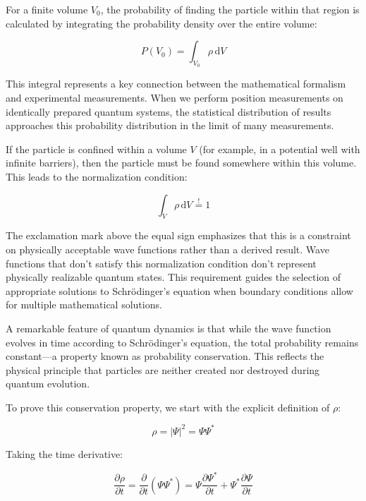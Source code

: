 \documentclass[italian]{HKNdocument}
\begin{document}
For a finite volume $V_{0}$, the probability of finding the particle within that region is calculated by integrating the probability density over the entire volume:

\begin{equation}
P\left(V_{0}\right)=\int_{V_{0}} \rho \, \mathrm{d} V \label{eq:1.25}
\end{equation}

This integral represents a key connection between the mathematical formalism and experimental measurements. When we perform position measurements on identically prepared quantum systems, the statistical distribution of results approaches this probability distribution in the limit of many measurements.

If the particle is confined within a volume $V$ (for example, in a potential well with infinite barriers), then the particle must be found somewhere within this volume. This leads to the normalization condition:

\begin{equation}
\int_{V} \rho \, \mathrm{d} V \stackrel{!}{=} 1 \label{eq:1.26}
\end{equation}

The exclamation mark above the equal sign emphasizes that this is a constraint on physically acceptable wave functions rather than a derived result. Wave functions that don't satisfy this normalization condition don't represent physically realizable quantum states. This requirement guides the selection of appropriate solutions to Schrödinger's equation when boundary conditions allow for multiple mathematical solutions.

A remarkable feature of quantum dynamics is that while the wave function evolves in time according to Schrödinger's equation, the total probability remains constant—a property known as probability conservation. This reflects the physical principle that particles are neither created nor destroyed during quantum evolution.

To prove this conservation property, we start with the explicit definition of $\rho$:

\begin{equation}
\rho=|\Psi|^{2}=\Psi \Psi^{*} \label{eq:1.27}
\end{equation}

Taking the time derivative:

\begin{equation}
\frac{\partial \rho}{\partial t}=\frac{\partial}{\partial t}(\Psi \Psi^{*})=\Psi \frac{\partial \Psi^{*}}{\partial t}+\Psi^{*} \frac{\partial \Psi}{\partial t} \label{eq:1.28}
\end{equation}
\end{document}
